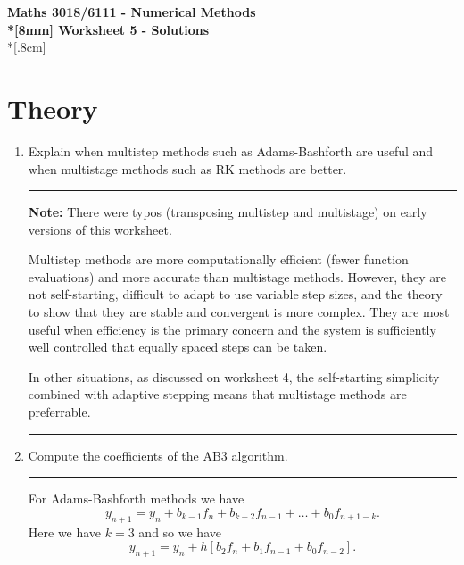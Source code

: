 \documentclass[10pt]{article}
\begin{document}
\thispagestyle{empty}
\begin{center}
\textbf{\Large Maths 3018/6111 - Numerical Methods \\*[8mm]
Worksheet 5 - Solutions}\\*[.8cm]
\end{center}

\section*{Theory}

\begin{enumerate}
\item Explain when multistep methods such as Adams-Bashforth are
  useful and when multistage methods such as RK methods are better.
  \begin{center}
    \rule{0.9\textwidth}{.1pt}
  \end{center}
  {\bf Note:} There were typos (transposing multistep and multistage)
  on early versions of this worksheet.

  Multistep methods are more computationally efficient (fewer function
  evaluations) and more accurate than multistage methods. However,
  they are not self-starting, difficult to adapt to use variable step
  sizes, and the theory to show that they are stable and convergent is
  more complex. They are most useful when efficiency is the primary
  concern and the system is sufficiently well controlled that equally
  spaced steps can be taken.

  In other situations, as discussed on worksheet 4, the self-starting
  simplicity combined with adaptive stepping means that multistage
  methods are preferrable.
  \begin{center}
    \rule{0.9\textwidth}{.1pt}
  \end{center}
\item Compute the coefficients of the AB3 algorithm.
  \begin{center}
    \rule{0.9\textwidth}{.1pt}
  \end{center}
  For Adams-Bashforth methods we have
  \begin{equation*}
    y_{n+1} = y_n + b_{k-1} f_n + b_{k-2} f_{n-1} + \dots + b_0
    f_{n+1-k}. 
  \end{equation*}
  Here we have $k=3$ and so we have
  \begin{equation*}
    y_{n+1} = y_n + h \left[b_{2} f_n + b_{1} f_{n-1} + b_0 f_{n-2}
    \right].
  \end{equation*}


\end{enumerate}
\end{document}
